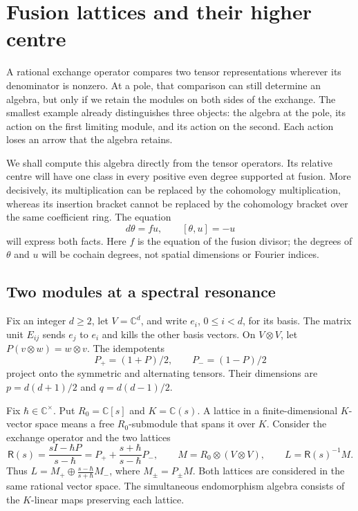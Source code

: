 \chapter{Fusion lattices and their higher centre}
\label{chap:fc-fusion}

A rational exchange operator compares two tensor representations wherever
its denominator is nonzero. At a pole, that comparison can still determine
an algebra, but only if we retain the modules on both sides of the exchange.
The smallest example already distinguishes three objects: the algebra at
the pole, its action on the first limiting module, and its action on the
second. Each action loses an arrow that the algebra retains.

We shall compute this algebra directly from the tensor operators. Its
relative centre will have one class in every positive even degree supported
at fusion. More decisively, its multiplication can be replaced by the
cohomology multiplication, whereas its insertion bracket cannot be replaced
by the cohomology bracket over the same coefficient ring. The equation
\[
 d\theta=fu,\qquad [\theta,u]=-u
\]
will express both facts. Here \(f\) is the equation of the fusion divisor;
the degrees of \(\theta\) and \(u\) will be cochain degrees, not spatial
dimensions or Fourier indices.

\section{Two modules at a spectral resonance}

Fix an integer \(d\geq2\), let \(V=\mathbb C^d\), and write \(e_i\),
\(0\leq i<d\), for its basis. The matrix unit \(E_{ij}\) sends \(e_j\)
to \(e_i\) and kills the other basis vectors. On \(V\otimes V\), let
\(P(v\otimes w)=w\otimes v\). The idempotents
\[
 P_+=(1+P)/2,\qquad P_-=(1-P)/2
\]
project onto the symmetric and alternating tensors. Their dimensions are
\(p=d(d+1)/2\) and \(q=d(d-1)/2\).

Fix \(\hbar\in\mathbb C^\times\). Put \(R_0=\mathbb C[s]\) and
\(K=\mathbb C(s)\). A lattice in a finite-dimensional \(K\)-vector
space means a free \(R_0\)-submodule that spans it over \(K\).
Consider the exchange operator and the two lattices
\begin{equation}\label{eq:fc-lattices}
 \mathsf R(s)=\frac{sI-\hbar P}{s-\hbar}
   =P_++\frac{s+\hbar}{s-\hbar}P_-,\qquad
 M=R_0\otimes(V\otimes V),\qquad L=\mathsf R(s)^{-1}M.
\end{equation}
Thus \(L=M_+\oplus\frac{s-\hbar}{s+\hbar}M_-\), where
\(M_\pm=P_\pm M\). Both lattices are considered in the same rational
vector space. The simultaneous endomorphism algebra consists of the
\(K\)-linear maps preserving each lattice.

